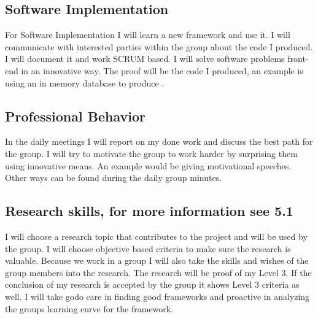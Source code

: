 \subsection{Software Implementation}
For Software Implementation I will learn a new framework and use it. I will communicate with interested parties within the group about the code I produced. I will document it and work SCRUM based. I will solve software problems front-end in an innovative way. The proof will be the code I produced, an example is using an in memory database to produce .

\subsection{Professional Behavior}
In the daily meetings I will report on my done work and discuss the best path for the group. I will try to motivate the group to work harder by surprising them using innovative means. An example would be giving motivational speeches. Other ways can be found during the daily group minutes.

\subsection{Research skills, for more information see 5.1}
I will choose a research topic that contributes to the project and will be used by the group. I will choose objective based criteria to make sure the research is valuable. Because we work in a group I will also take the skills and wishes of the group members into the research. The research will be proof of my Level 3. If the conclusion of my research is accepted by the group it shows Level 3 criteria as well. I will take godo care in finding good frameworks and proactive in analyzing the groups learning curve for the framework.
